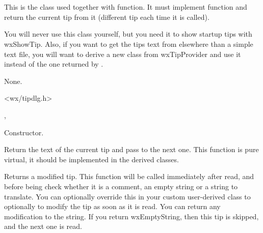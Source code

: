 \section{}\label{wxtipprovider}

This is the class used together with  function.
It must implement  function and return the
current tip from it (different tip each time it is called).

You will never use this class yourself, but you need it to show startup tips
with wxShowTip. Also, if you want to get the tips text from elsewhere than a
simple text file, you will want to derive a new class from wxTipProvider and
use it instead of the one returned by .


None.


<wx/tipdlg.h>




, 


\label{wxtipproviderctor}


Constructor.


\label{wxtipprovidergettip}


Return the text of the current tip and pass to the next one. This function is
pure virtual, it should be implemented in the derived classes.

\label{wxtipproviderpreprocesstip}


Returns a modified tip. This function will be called immediately after read,
and before being check whether it is a comment, an empty string or a string 
to translate. You can optionally override this in your custom user-derived class 
to optionally to modify the tip as soon as it is read. You can return any 
modification to the string. If you return wxEmptyString, then this tip is 
skipped, and the next one is read.


